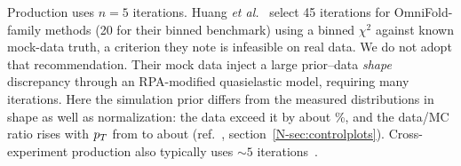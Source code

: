 Production uses $n=5$ iterations. Huang \emph{et al.}~\cite{Huang:2025omnifold} select 45 iterations for OmniFold-family methods (20 for their binned benchmark) using a binned $\chi^{2}$ against known mock-data truth, a criterion they note is infeasible on real data. We do not adopt that recommendation. Their mock data inject a large prior--data \emph{shape} discrepancy through an RPA-modified quasielastic model, requiring many iterations. Here the simulation prior differs from the measured distributions in shape as well as normalization: the data exceed it by about \%, and the data/MC ratio rises with $p_{T}$ from  to about  (ref.~\cite{AnalysisNote2026}, section~\ref*{N-sec:controlplots}). Cross-experiment production also typically uses ${\sim}5$ iterations~\cite{Canelli:2025guide}.

